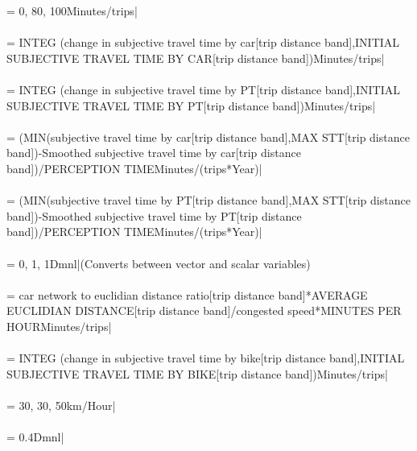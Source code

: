  = {\small 0, 80, 100Minutes/trips|} \\ \\ 
 = {\small  INTEG (change in subjective travel time by car[trip distance band],INITIAL SUBJECTIVE TRAVEL TIME BY CAR[trip distance band])Minutes/trips|} \\ \\ 
 = {\small  INTEG (change in subjective travel time by PT[trip distance band],INITIAL SUBJECTIVE TRAVEL TIME BY PT[trip distance band])Minutes/trips|} \\ \\ 
 = {\small (MIN(subjective travel time by car[trip distance band],MAX STT[trip distance band])-Smoothed subjective travel time by car[trip distance band])/PERCEPTION TIMEMinutes/(trips*Year)|} \\ \\ 
 = {\small (MIN(subjective travel time by PT[trip distance band],MAX STT[trip distance band])-Smoothed subjective travel time by PT[trip distance band])/PERCEPTION TIMEMinutes/(trips*Year)|} \\ \\ 
 = {\small 0, 1, 1Dmnl|}{\small  (Converts between vector and scalar variables)} \\ \\ 
 = {\small car network to euclidian distance ratio[trip distance band]*AVERAGE EUCLIDIAN DISTANCE[trip distance band]/congested speed*MINUTES PER HOURMinutes/trips|} \\ \\ 
 = {\small  INTEG (change in subjective travel time by bike[trip distance band],INITIAL SUBJECTIVE TRAVEL TIME BY BIKE[trip distance band])Minutes/trips|} \\ \\ 
 = {\small 30, 30, 50km/Hour|} \\ \\ 
 = {\small 0.4Dmnl|} \\ \\ 
